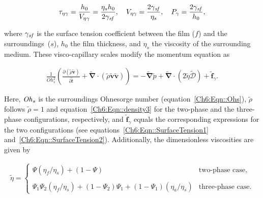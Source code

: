 \begin{align}
	\label{Ch6:Eqn::Scales2}
	\tau_{\eta\gamma} = \frac{h_0}{V_{\eta\gamma}} = \frac{\eta_s h_0}{2\gamma_\mathit{sf}}, \quad V_{\eta\gamma} = \frac{2\gamma_\mathit{sf}}{\eta_s}, \quad P_\gamma = \frac{2\gamma_\mathit{sf}}{h_0},
\end{align}

\noindent where $\gamma_\mathit{sf}$ is the surface tension coefficient between the film ($f$) and the surroundings~($s$), $h_0$ the film thickness, and $\eta_s$ the viscosity of the surrounding medium. These visco-capillary scales modify the momentum equation as

\begin{align}
	\label{Ch6:Eqn::NS3}
	\frac{1}{Oh_s^2}\left(\frac{\partial \left(\tilde{\rho}\boldsymbol{\tilde{v}}\right)}{\partial \tilde{t}} + \boldsymbol{\tilde{\nabla}\cdot}\left(\tilde{\rho}\boldsymbol{\tilde{v}}\boldsymbol{\tilde{v}}\right)\right) = -\boldsymbol{\tilde{\nabla}} \tilde{p} + \boldsymbol{\tilde{\nabla}\cdot}\left(2\tilde{\eta}\boldsymbol{\tilde{\mathcal{D}}}\right) + \boldsymbol{\tilde{f}}_\gamma.
\end{align}

\noindent Here, $\mathit{Oh}_\mathit{s}$ is the surroundings Ohnesorge number (equation~\eqref{Ch6:Eqn::Ohs}), $\tilde{\rho}$ follows $\tilde{\rho} = 1$ and equation~\eqref{Ch6:Eqn::density3} for the two-phase and the three-phase configurations, respectively, and $\boldsymbol{\tilde{f}}_\gamma$ equals the corresponding expressions for the two configurations (see equations~\eqref{Ch6:Eqn::SurfaceTension1} and~\eqref{Ch6:Eqn::SurfaceTension2}). Additionally, the dimensionless viscosities are given by

\begin{align}
	\label{Ch6:Eqn::Oh4}
	\tilde{\eta} = 
	\begin{cases}
		\Psi \left(\eta_f/\eta_s\right) + \left(1-\Psi\right)&\text{two-phase case},\\
		\\
		\Psi_1\Psi_2\left(\eta_f/\eta_s\right) + \left(1-\Psi_2\right)\Psi_1 + \left(1-\Psi_1\right)\left(\eta_a/\eta_s\right)&\text{three-phase case}.
	\end{cases}
\end{align}

